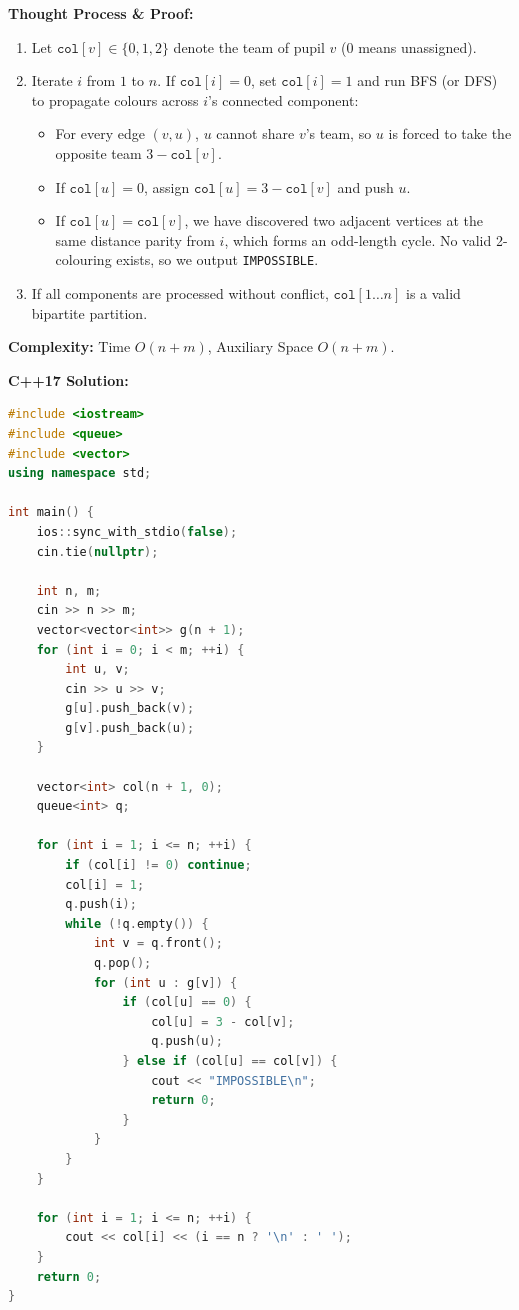 \documentclass[11pt]{article}
\begin{document}
\textbf{Thought Process \& Proof:}
\begin{enumerate}
    \item Let $\texttt{col}[v] \in \{0, 1, 2\}$ denote the team of pupil $v$ ($0$ means unassigned).
    \item Iterate $i$ from $1$ to $n$. If $\texttt{col}[i] = 0$, set $\texttt{col}[i] = 1$ and run BFS (or DFS) to propagate colours across $i$'s connected component:
    \begin{itemize}
        \item For every edge $(v, u)$, $u$ cannot share $v$'s team, so $u$ is forced to take the opposite team $3 - \texttt{col}[v]$.
        \item If $\texttt{col}[u] = 0$, assign $\texttt{col}[u] = 3 - \texttt{col}[v]$ and push $u$.
        \item If $\texttt{col}[u] = \texttt{col}[v]$, we have discovered two adjacent vertices at the same distance parity from $i$, which forms an odd-length cycle. No valid 2-colouring exists, so we output \texttt{IMPOSSIBLE}.
    \end{itemize}
    \item If all components are processed without conflict, $\texttt{col}[1\dots n]$ is a valid bipartite partition.
\end{enumerate}

\textbf{Complexity:} Time $O(n + m)$, Auxiliary Space $O(n + m)$.

\textbf{C++17 Solution:}
\begin{lstlisting}[language=C++]
#include <iostream>
#include <queue>
#include <vector>
using namespace std;

int main() {
    ios::sync_with_stdio(false);
    cin.tie(nullptr);

    int n, m;
    cin >> n >> m;
    vector<vector<int>> g(n + 1);
    for (int i = 0; i < m; ++i) {
        int u, v;
        cin >> u >> v;
        g[u].push_back(v);
        g[v].push_back(u);
    }

    vector<int> col(n + 1, 0);
    queue<int> q;

    for (int i = 1; i <= n; ++i) {
        if (col[i] != 0) continue;
        col[i] = 1;
        q.push(i);
        while (!q.empty()) {
            int v = q.front();
            q.pop();
            for (int u : g[v]) {
                if (col[u] == 0) {
                    col[u] = 3 - col[v];
                    q.push(u);
                } else if (col[u] == col[v]) {
                    cout << "IMPOSSIBLE\n";
                    return 0;
                }
            }
        }
    }

    for (int i = 1; i <= n; ++i) {
        cout << col[i] << (i == n ? '\n' : ' ');
    }
    return 0;
}
\end{lstlisting}
\end{document}
